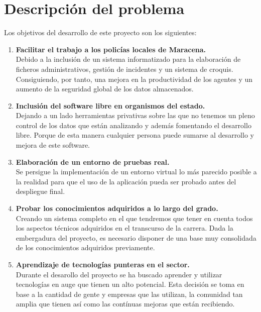 \chapter{Descripción del problema}
Los objetivos del desarrollo de este proyecto son los siguientes:
\begin{enumerate}
    \item \textbf{Facilitar el trabajo a los policías locales de Maracena.}\\
    Debido a la inclusión de un sistema informatizado para la elaboración de 
    ficheros administrativos, gestión de incidentes y un sistema de croquis. Consiguiendo,
    por tanto, una mejora en la productividad de los agentes y un aumento de la seguridad
    global de los datos almacenados.
    
    \item \textbf{Inclusión del software libre en organismos del estado.}\\
    Dejando a un lado herramientas privativas sobre las que no tenemos un pleno control
    de los datos que están analizando y además fomentando el desarrollo libre. Porque 
    de esta manera cualquier persona puede sumarse al desarrollo y mejora de este software.

    \item \textbf{Elaboración de un entorno de pruebas real.}\\
    Se persigue la implementación de un entorno virtual lo más parecido posible a la 
    realidad para que el uso de la aplicación pueda ser probado antes del despliegue 
    final. 
   
    \item \textbf{Probar los conocimientos adquiridos a lo largo del grado.}\\
    Creando un sistema completo en el que tendremos que tener en cuenta todos los 
    aspectos técnicos adquiridos en el transcurso de la carrera. Dada la embergadura del
    proyecto, es necesario disponer de una base muy consolidada de los conocimientos adquiridos
    previamente.

    \item \textbf{Aprendizaje de tecnologías punteras en el sector.}\\
    Durante el desarollo del proyecto se ha buscado aprender y utilizar tecnologías en 
    auge que tienen un alto potencial. Esta decisión se toma en base  a la cantidad de gente
    y empresas que las utilizan, la comunidad tan amplia que tienen así como las contínuas
    mejoras que están recibiendo.  

\end{enumerate}
